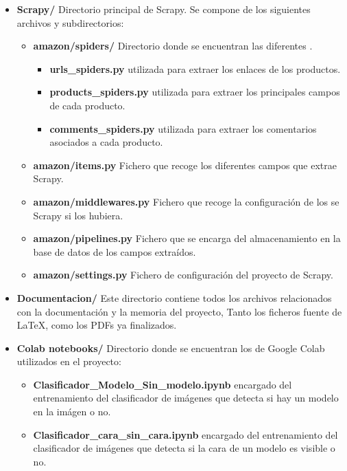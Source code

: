 \begin{itemize}
    \item \textbf{Scrapy/} Directorio principal de Scrapy. Se compone de los siguientes archivos y subdirectorios:
        \begin{itemize}
            \item \textbf{amazon/spiders/} Directorio donde se encuentran las diferentes .
                \begin{itemize}
                    \item \textbf{urls\_spiders.py}  utilizada para extraer los enlaces de los productos.
                    \item \textbf{products\_spiders.py}  utilizada para extraer los principales campos de cada producto.
                    \item \textbf{comments\_spiders.py}  utilizada para extraer los comentarios asociados a cada producto.
                \end{itemize}
            \item \textbf{amazon/items.py} Fichero que recoge los diferentes campos que extrae Scrapy.
            \item \textbf{amazon/middlewares.py} Fichero que recoge la configuración de los  se Scrapy si los hubiera.
            \item \textbf{amazon/pipelines.py} Fichero que se encarga del almacenamiento en la base de datos de los campos extraídos.
            \item \textbf{amazon/settings.py} Fichero de configuración del proyecto de Scrapy.
        \end{itemize}
    \item \textbf{Documentacion/} Este directorio contiene todos los archivos relacionados con la documentación y la memoria del proyecto, Tanto los ficheros fuente de \LaTeX{}, como los PDFs ya finalizados.
    \item \textbf{Colab notebooks/} Directorio donde se encuentran los  de Google Colab utilizados en el proyecto:
        \begin{itemize}
            \item \textbf{Clasificador\_Modelo\_Sin\_modelo.ipynb}  encargado del entrenamiento del clasificador de  imágenes que detecta si hay un modelo en la imágen o no.
            \item \textbf{Clasificador\_cara\_sin\_cara.ipynb}  encargado del entrenamiento del clasificador de  imágenes que detecta si la cara de un modelo es visible o no.

\end{itemize}
\end{itemize}
